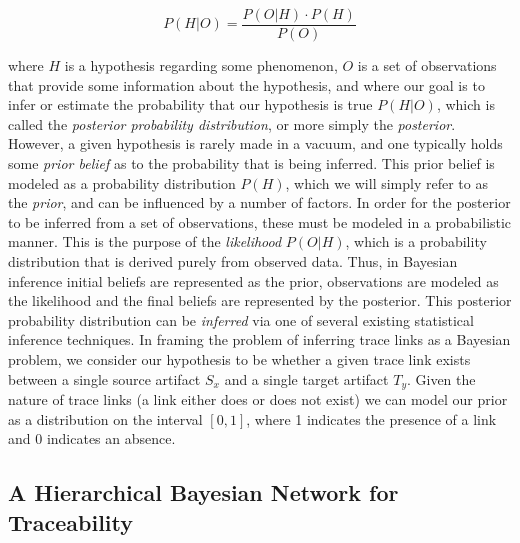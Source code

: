 \begin{equation}
P(H|O) = \frac{P(O|H)\cdot P(H)}{P(O)}
\end{equation}

\noindent where $H$ is a hypothesis regarding some phenomenon, $O$ is a set of observations that provide some information about the hypothesis, and where our goal is to infer or estimate the probability that our hypothesis is true $P(H|O)$, which is called the \textit{posterior probability distribution}, or more simply the \textit{posterior}. However, a given hypothesis is rarely made in a vacuum, and one typically holds some \textit{prior belief} as to the probability that is being inferred.  This prior belief is modeled as a probability distribution $P(H)$, which we will simply refer to as the \textit{prior}, and can be influenced by a number of factors. In order for the posterior to be inferred from a set of observations, these must be modeled in a probabilistic manner. This is the purpose of the \textit{likelihood} $P(O|H)$, which is a probability distribution that is derived purely from observed data. Thus, in Bayesian inference initial beliefs are represented as the prior, observations are modeled as the likelihood and the final beliefs are represented by the posterior. This posterior probability distribution can be \textit{inferred} via one of several existing statistical inference techniques. In framing the problem of inferring trace links as a Bayesian problem, we consider our hypothesis to be whether a given trace link exists between a single source artifact $S_x$ and a single target artifact $T_y$. Given the nature of trace links (\eg a link either does or does not exist) we can model our prior as a distribution on the interval $[0,1]$, where 1 indicates the presence of a link and 0 indicates an absence. 

\subsection{A Hierarchical Bayesian Network for Traceability}

